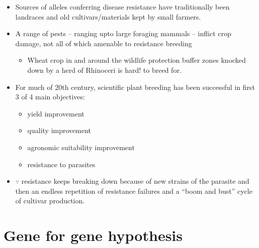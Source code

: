 \documentclass[11pt,dvipsnames,ignorenonframetext,aspectratio=169]{beamer}
\providecommand{\tightlist}{%
  \setlength{\itemsep}{0pt}\setlength{\parskip}{0pt}}
\begin{document}
\begin{frame}{}
\protect\hypertarget{section-9}{}
\small

\begin{itemize}
\tightlist
\item
  Sources of alleles conferring disease resistance have traditionally
  been landraces and old cultivars/materials kept by small farmers.
\item
  A range of pests -- ranging upto large foraging mammals -- inflict
  crop damage, not all of which amenable to resistance breeding

  \begin{itemize}
  \tightlist
  \item
    Wheat crop in and around the wildlife protection buffer zones
    knocked down by a herd of Rhinoceri is hard! to breed for.\\
  \end{itemize}
\item
  For much of 20th century, scientific plant breeding has been
  successful in first 3 of 4 main objectives:

  \begin{itemize}
  \tightlist
  \item
    yield improvement
  \item
    quality improvement
  \item
    agronomic suitability improvement
  \item
    resistance to parasites
  \end{itemize}
\item
  \(\because\) resistance keeps breaking down because of new strains of
  the parasite and then an endless repetition of resistance failures and
  a ``boom and bust'' cycle of cultivar production.
\end{itemize}
\end{frame}

\hypertarget{gene-for-gene-hypothesis}{%
\section{Gene for gene hypothesis}\label{gene-for-gene-hypothesis}}
\end{document}

